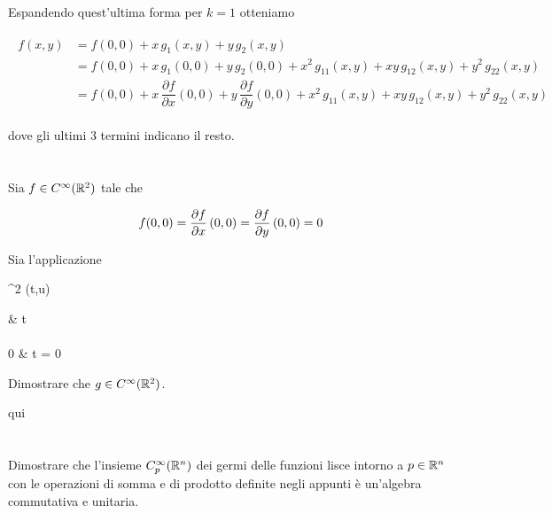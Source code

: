 Espandendo quest'ultima forma per $ k=1 $ otteniamo

\begin{align}
	\begin{split}
		f(x,y) &= f(0,0) + x \, g_{1} (x,y) + y \, g_{2} (x,y)\\
		&= f(0,0) + x \, g_{1} (0,0) + y \, g_{2} (0,0) + x^{2} \, g_{11}(x,y) + x y \, g_{12}(x,y) + y^{2} \, g_{22}(x,y)\\
		&= f(0,0) + x \, \dfrac{\partial f}{\partial x} (0,0) + y \, \dfrac{\partial f}{\partial y} (0,0) + x^{2} \, g_{11}(x,y) + x y \, g_{12}(x,y) + y^{2} \, g_{22}(x,y)
	\end{split}
\end{align}

dove gli ultimi 3 termini indicano il resto.

%

\newpage

%

\section{}\label{es1-6}

\begin{tcolorbox}
	Sia $ f \in C^{\infty} (\mathbb{R}^{2}) $ tale che
	
	\begin{equation}
		f(0,0) = \pdv{f}{x} \, (0,0) = \pdv{f}{y} \, (0,0) = 0
	\end{equation}

	Sia l'applicazione
	
		{\R^{2}}{\R}
		{(t,u)}{%
			\begin{cases}
				 & t \neq 0\\\\
				0 & t = 0
			\end{cases}
			}
	
	Dimostrare che $ g \in C^{\infty}(\mathbb{R}^{2}) $.
\end{tcolorbox}

qui

%

\newpage

%

\section{}\label{es1-7}

\begin{tcolorbox}
	Dimostrare che l'insieme $ C_{p}^{\infty}(\mathbb{R}^{n}) $ dei germi delle funzioni lisce intorno a $ p \in \mathbb{R}^{n} $ con le operazioni di somma e di prodotto definite negli appunti è un'algebra commutativa e unitaria.
\end{tcolorbox}

